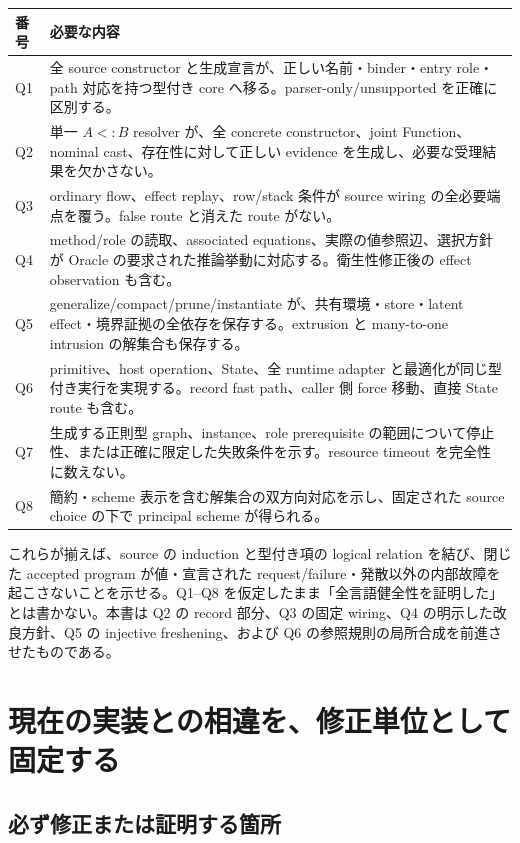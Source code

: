 \documentclass[11pt,a4paper]{article}
\theoremstyle{remark}
\begin{document}
\begin{longtable}{p{}p{}}
\toprule
番号 & 必要な内容 \\
\midrule\endhead
Q1 & 全 source constructor と生成宣言が、正しい名前・binder・entry role・path 対応を持つ型付き core へ移る。parser-only/unsupported を正確に区別する。\\
Q2 & 単一 $A<:B$ resolver が、全 concrete constructor、joint Function、nominal cast、存在性に対して正しい evidence を生成し、必要な受理結果を欠かさない。\\
Q3 & ordinary flow、effect replay、row/stack 条件が source wiring の全必要端点を覆う。false route と消えた route がない。\\
Q4 & method/role の読取、associated equations、実際の値参照辺、選択方針が Oracle の要求された推論挙動に対応する。衛生性修正後の effect observation も含む。\\
Q5 & generalize/compact/prune/instantiate が、共有環境・store・latent effect・境界証拠の全依存を保存する。extrusion と many-to-one intrusion の解集合も保存する。\\
Q6 & primitive、host operation、State、全 runtime adapter と最適化が同じ型付き実行を実現する。record fast path、caller 側 force 移動、直接 State route も含む。\\
Q7 & 生成する正則型 graph、instance、role prerequisite の範囲について停止性、または正確に限定した失敗条件を示す。resource timeout を完全性に数えない。\\
Q8 & 簡約・scheme 表示を含む解集合の双方向対応を示し、固定された source choice の下で principal scheme が得られる。\\
\bottomrule
\end{longtable}

これらが揃えば、source の induction と型付き項の logical relation を結び、閉じた accepted program が値・宣言された request/failure・発散以外の内部故障を起こさないことを示せる。Q1--Q8 を仮定したまま「全言語健全性を証明した」とは書かない。本書は Q2 の record 部分、Q3 の固定 wiring、Q4 の明示した改良方針、Q5 の injective freshening、および Q6 の参照規則の局所合成を前進させたものである。

\section{現在の実装との相違を、修正単位として固定する}

\subsection{必ず修正または証明する箇所}
\end{document}
